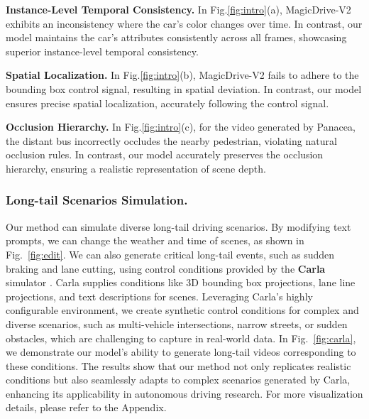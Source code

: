 \noindent \textbf{Instance-Level Temporal Consistency.} 
In Fig.\ref{fig:intro}(a), MagicDrive-V2 exhibits an inconsistency where the car's color changes over time. In contrast, our model maintains the car's attributes consistently across all frames, showcasing superior instance-level temporal consistency.

\noindent \textbf{Spatial Localization.} 
In Fig.\ref{fig:intro}(b), MagicDrive-V2 fails to adhere to the bounding box control signal, resulting in spatial deviation. In contrast, our model ensures precise spatial localization, accurately following the control signal.

\noindent \textbf{Occlusion Hierarchy.} 
In Fig.\ref{fig:intro}(c), for the video generated by Panacea, 
the distant bus incorrectly occludes the nearby pedestrian, violating natural occlusion rules. 
In contrast, our model accurately preserves the occlusion hierarchy, ensuring a realistic representation of scene depth.


\subsubsection{Long-tail Scenarios Simulation.}
Our method can simulate diverse long-tail driving scenarios. By modifying text prompts, we can change the weather and time of scenes, as shown in Fig.~\ref{fig:edit}. We can also generate critical long-tail events, such as sudden braking and lane cutting, using control conditions provided by the \textbf{Carla} simulator \cite{Dosovitskiy17}. Carla supplies conditions like 3D bounding box projections, lane line projections, and text descriptions for scenes. Leveraging Carla's highly configurable environment, we create synthetic control conditions for complex and diverse scenarios, such as multi-vehicle intersections, narrow streets, or sudden obstacles, which are challenging to capture in real-world data. In Fig.~\ref{fig:carla}, we demonstrate our model's ability to generate long-tail videos corresponding to these conditions. The results show that our method not only replicates realistic conditions but also seamlessly adapts to complex scenarios generated by Carla, enhancing its applicability in autonomous driving research. For more visualization details, please refer to the Appendix.



